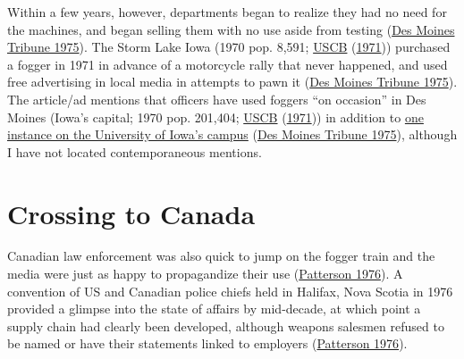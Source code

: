 \documentclass[
  11pt,
]{krantz}
\begin{document}
Within a few years, however, departments began to realize they had no need for the machines, and began selling them with no use aside from testing (\protect\hyperlink{ref-DesMoinesTribune1975_05_06}{Des Moines Tribune 1975}).
The Storm Lake Iowa (1970 pop. 8,591; \protect\hyperlink{ref-USCB1970}{USCB} (\protect\hyperlink{ref-USCB1970}{1971})) purchased a fogger in 1971 in advance of a motorcycle rally that never happened, and used free advertising in local media in attempts to pawn it (\protect\hyperlink{ref-DesMoinesTribune1975_05_06}{Des Moines Tribune 1975}).
The article/ad mentions that officers have used foggers ``on occasion'' in Des Moines (Iowa's capital; 1970 pop. 201,404; \protect\hyperlink{ref-USCB1970}{USCB} (\protect\hyperlink{ref-USCB1970}{1971})) in addition to \protect\hyperlink{IowaCity}{one instance on the University of Iowa's campus} (\protect\hyperlink{ref-DesMoinesTribune1975_05_06}{Des Moines Tribune 1975}), although I have not located contemporaneous mentions.

\hypertarget{Canada}{%
\section{Crossing to Canada}\label{Canada}}

Canadian law enforcement was also quick to jump on the fogger train and the media were just as happy to propagandize their use (\protect\hyperlink{ref-Patterson1976}{Patterson 1976}).
A convention of US and Canadian police chiefs held in Halifax, Nova Scotia in 1976 provided a glimpse into the state of affairs by mid-decade, at which point a supply chain had clearly been developed, although weapons salesmen refused to be named or have their statements linked to employers (\protect\hyperlink{ref-Patterson1976}{Patterson 1976}).
\end{document}
